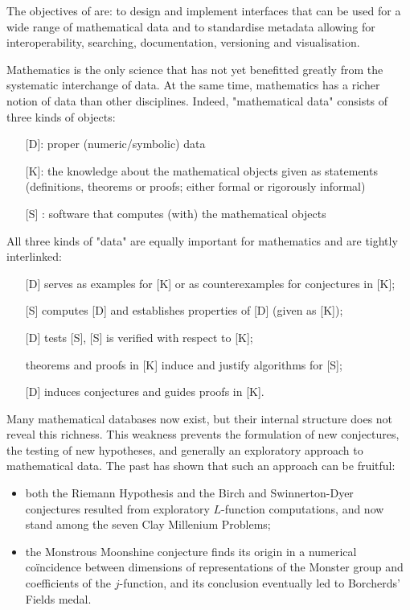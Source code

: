 \addtocounter{wpno}{1}
\begin{Workpackage}{\thewpno}
\WPTitle{\wpname{\thewpno}}


\begin{WPObjectives}
The objectives of \theWP{} are: to design and implement interfaces that can be used for a wide range of mathematical data and to standardise metadata allowing for interoperability, searching, documentation, versioning and visualisation.
\end{WPObjectives}


\begin{WPDescription}
Mathematics is the only science that has not yet benefitted greatly from the systematic interchange of data. At the same time, mathematics has a richer notion of data than other disciplines.
Indeed, "mathematical data" consists of three kinds of objects:
\begin{itemize}
\item[] [D]: proper (numeric/symbolic) data
\item[] [K]:  the knowledge about the mathematical objects given as statements (definitions, theorems or proofs; either formal or rigorously informal)
\item[] [S] : software that computes (with) the mathematical objects
\end{itemize}

All three kinds of "data" are equally important for mathematics and are tightly interlinked:
\begin{itemize}
\item[] [D] serves as examples for [K] or as counterexamples for conjectures in [K];
\item[] [S] computes [D] and establishes properties of [D] (given as [K]);
\item[] [D] tests [S], [S] is verified with respect to [K];
\item[] theorems and proofs in [K] induce and justify algorithms for [S];
\item[] [D] induces conjectures and guides proofs in [K].
\end{itemize}

Many mathematical databases now exist, but their internal structure does not reveal this richness. This weakness prevents the formulation of new conjectures, the testing of new hypotheses, and generally an exploratory approach to mathematical data. The past has shown that such an approach can be fruitful: 
\begin{itemize}
\item both the Riemann Hypothesis and the Birch and Swinnerton-Dyer conjectures resulted from exploratory $L$-function computations, and now stand among the seven Clay Millenium Problems;
\item the Monstrous Moonshine conjecture finds its origin in a numerical co\"incidence between dimensions of representations of the Monster group and coefficients of the $j$-function, and its conclusion eventually led to Borcherds' Fields medal.
\end{itemize}


\end{WPDescription}
\end{Workpackage}
